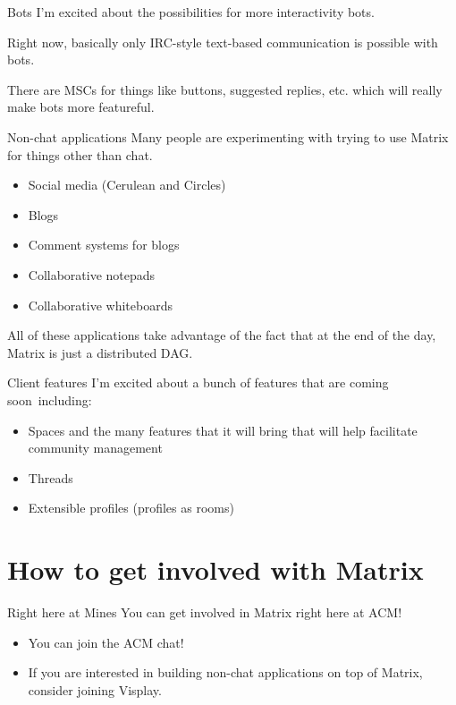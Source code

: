 \documentclass{acm}
\begin{document}
\begin{frame}{Bots}
    I'm excited about the possibilities for more interactivity bots.
    \pause

    Right now, basically only IRC-style text-based communication is possible
    with bots.

    There are MSCs for things like buttons, suggested replies, etc. which will
    really make bots more featureful.
\end{frame}

\begin{frame}{Non-chat applications}
    Many people are experimenting with trying to use Matrix for things other
    than chat.

    \begin{itemize}
        \item Social media (Cerulean and Circles)
        \item Blogs
        \item Comment systems for blogs
        \item Collaborative notepads
        \item Collaborative whiteboards
    \end{itemize}

    All of these applications take advantage of the fact that at the end of the
    day, Matrix is just a distributed DAG.
\end{frame}

\begin{frame}{Client features}
    I'm excited about a bunch of features that are coming soon\texttrademark\ 
    including:

    \begin{itemize}
        \item Spaces and the many features that it will bring that will help
            facilitate community management
        \item Threads
        \item Extensible profiles (profiles as rooms)
    \end{itemize}
\end{frame}

\section{How to get involved with Matrix}

\begin{frame}{Right here at Mines}
    You can get involved in Matrix right here at ACM!

    \begin{itemize}
        \item You can join the ACM chat!
        \item If you are interested in building non-chat applications on top of
            Matrix, consider joining Visplay.
    \end{itemize}
\end{frame}
\end{document}
